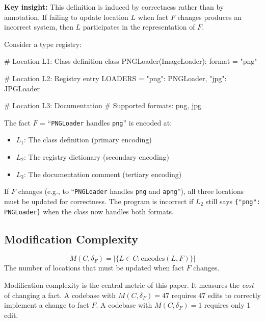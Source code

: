 \textbf{Key insight:} This definition is induced by correctness rather than by annotation. If failing to update location $L$ when fact $F$ changes produces an incorrect system, then $L$ participates in the representation of $F$.

\begin{example}\label{ex:encoding}
Consider a type registry:

\begin{code}
# Location L1: Class definition
class PNGLoader(ImageLoader):
    format = "png"

# Location L2: Registry entry
LOADERS = {"png": PNGLoader, "jpg": JPGLoader}

# Location L3: Documentation
# Supported formats: png, jpg
\end{code}

The fact $F$ = ``\texttt{PNGLoader} handles \texttt{png}'' is encoded at:
\begin{itemize}
\tightlist
\item $L_1$: The class definition (primary encoding)
\item $L_2$: The registry dictionary (secondary encoding)
\item $L_3$: The documentation comment (tertiary encoding)
\end{itemize}

If $F$ changes (e.g., to ``\texttt{PNGLoader} handles \texttt{png} and \texttt{apng}''), all three locations must be updated for correctness. The program is incorrect if $L_2$ still says \texttt{\{"png": PNGLoader\}} when the class now handles both formats.
\end{example}

\subsection{Modification Complexity}\label{sec:mod-complexity}

\begin{definition}\label{def:mod-complexity}
\[
M(C, \delta_F) = |\{L \in C : \text{encodes}(L, F)\}|
\]
The number of locations that must be updated when fact $F$ changes.
\end{definition}

Modification complexity is the central metric of this paper. It measures the \emph{cost} of changing a fact. A codebase with $M(C, \delta_F) = 47$ requires 47 edits to correctly implement a change to fact $F$. A codebase with $M(C, \delta_F) = 1$ requires only 1 edit.


